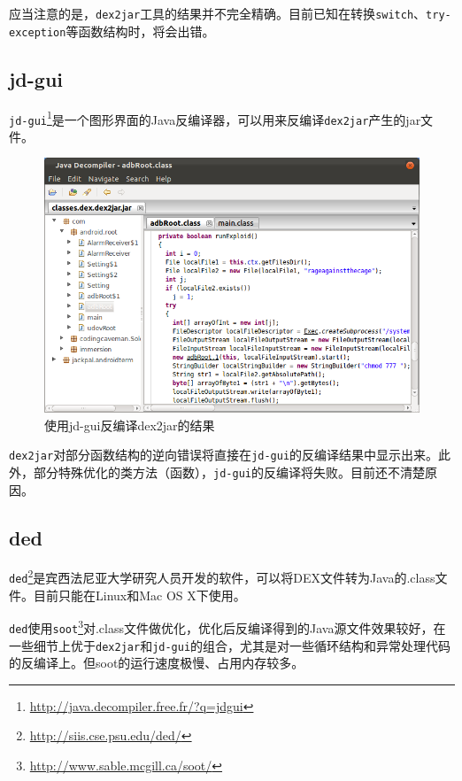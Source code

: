 应当注意的是，\lstinline!dex2jar!工具的结果并不完全精确。目前已知在转换\lstinline!switch!、\lstinline!try-exception!等函数结构时，将会出错。

\subsection{jd-gui}
\lstinline!jd-gui!\footnote{\url{http://java.decompiler.free.fr/?q=jdgui}}是一个图形界面的Java反编译器，可以用来反编译\lstinline!dex2jar!产生的jar文件。

\begin{figure}[htbp]
  \centering
  \includegraphics[width=14cm]{image/jd-gui.png}
  \caption{使用jd-gui反编译dex2jar的结果}
  \label{Fig:jd-gui}
\end{figure}

\lstinline!dex2jar!对部分函数结构的逆向错误将直接在\lstinline!jd-gui!的反编译结果中显示出来。此外，部分特殊优化的类方法（函数），\lstinline!jd-gui!的反编译将失败。目前还不清楚原因。

\subsection{ded}
\lstinline!ded!\footnote{\url{http://siis.cse.psu.edu/ded/}}是宾西法尼亚大学研究人员开发的软件，可以将DEX文件转为Java的.class文件。目前只能在Linux和Mac OS X下使用。

\lstinline!ded!使用\lstinline!soot!\footnote{\url{http://www.sable.mcgill.ca/soot/}}对.class文件做优化，优化后反编译得到的Java源文件效果较好，在一些细节上优于\lstinline!dex2jar!和\lstinline!jd-gui!的组合，尤其是对一些循环结构和异常处理代码的反编译上。但soot的运行速度极慢、占用内存较多。

